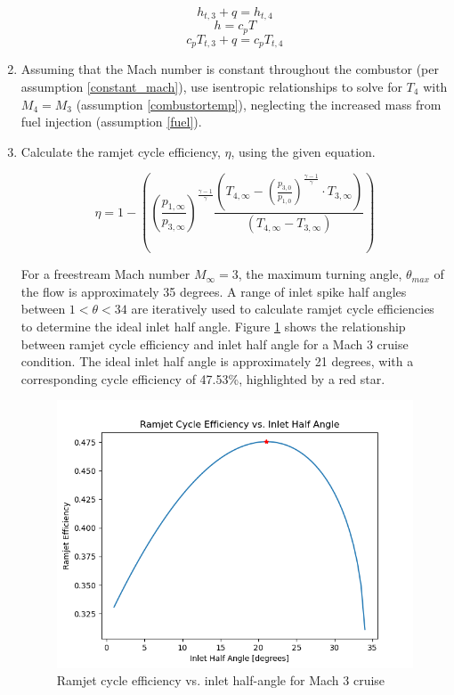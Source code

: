 \documentclass[../main.tex]{subfiles}
\begin{document}
\begin{enumerate}
    \[
        h_{t,3} + q = h_{t,4}  
    \]
    \[  
        h = c_p T    
    \]
    \[
        c_p T_{t,3} + q = c_p T_{t,4}     
    \]

    \item Assuming that the Mach number is constant throughout the combustor (per assumption \ref{constant_mach}), use isentropic relationships to solve for \(T_4\) with \(M_4=M_3\) (assumption \ref{combustortemp}), neglecting the increased mass from fuel injection (assumption \ref{fuel}).
    
    \item Calculate the ramjet cycle efficiency, \(\eta\), using the given equation.
    
    \[
    \eta = 1 - \left({
    \left({\frac{p_{1,\infty}}{p_{3,\infty}}}\right)^{\frac{\gamma-1}{\gamma}}
    \frac{
        \left({T_{4,\infty} - \left({\frac{p_{3,0}}{p_{1,0}}}\right)^{{\frac{\gamma-1}{\gamma}}}} \cdot T_{3,\infty}\right)
    }{\left({T_{4,\infty}-T_{3,\infty}}\right)}
    }\right)
\]

For a freestream Mach number \(M_\infty = 3\), the maximum turning angle, \(\theta_{max}\) of the flow is approximately 35 degrees.
A range of inlet spike half angles between \(1 < \theta < 34\) are iteratively used to calculate ramjet cycle efficiencies to determine the ideal inlet half angle.
Figure \ref{idealtheta} shows the relationship between ramjet cycle efficiency and inlet half angle for a Mach 3 cruise condition.
The ideal inlet half angle is approximately 21 degrees, with a corresponding cycle efficiency of 47.53\%, highlighted by a red star.

\begin{figure}[h!]
    \centering
    \includegraphics[]{../../images/problem_2/idealtheta.png}
    \caption{Ramjet cycle efficiency vs. inlet half-angle for Mach 3 cruise}
    \label{idealtheta}
\end{figure}

\end{enumerate}
\end{document}
